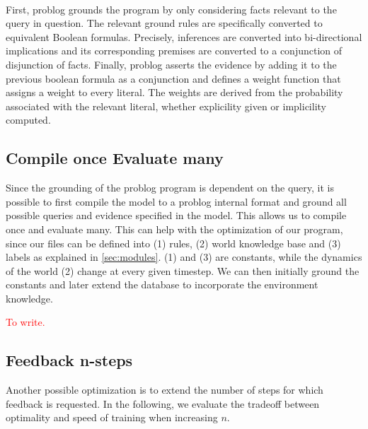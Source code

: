 \paragraph{}
First, problog grounds the program by only considering facts relevant to the query in question. 
The relevant ground rules are specifically converted to equivalent Boolean formulas. 
Precisely, inferences are converted into bi-directional implications and its corresponding premises 
are converted to a conjunction of disjunction of facts. 
Finally, problog asserts the evidence by adding it to the previous boolean formula 
as a conjunction and defines a weight function that assigns a weight to every literal. 
The weights are derived from the probability associated with the relevant literal, whether explicility 
given or implicility computed. 


\subsection{Compile once Evaluate many}
Since the grounding of the problog program is dependent on the query, it is possible to first compile the model 
to a problog internal format and ground all possible queries and evidence specified in the model. This allows us 
to compile once and evaluate many. This can help with the optimization of our program, since our files can be defined into 
(1) rules, (2) world knowledge base and (3) labels as explained in \ref{sec:modules}. (1) and (3) are constants, while the dynamics 
of the world (2) change at every given timestep. We can then initially ground the constants and later 
extend the database to incorporate the environment knowledge. 
 
\textcolor{red}{To write.} 

\subsection{Feedback n-steps} 
Another possible optimization is to extend the number of steps for which feedback is requested. In the 
following, we evaluate the tradeoff between optimality and speed of training when increasing $n$. 


